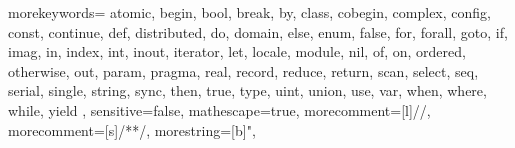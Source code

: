   {
    morekeywords={
      atomic,
      begin, bool, break, by,
      class, cobegin, complex, config, const, continue,
      def, distributed, do, domain,
      else, enum,
      false, for, forall,
      goto,
      if, imag, in, index, int, inout, iterator,
      let, locale,
      module,
      nil,
      of, on, ordered, otherwise, out,
      param, pragma,
      real, record, reduce, return,
      scan, select, seq, serial, single, string, sync,
      then, true, type,
      uint, union, use,
      var,
      when, where, while,
      yield
    },
    sensitive=false,
    mathescape=true,
    morecomment=[l]{//},
    morecomment=[s]{/*}{*/},
    morestring=[b]",
}


\newcommand{\chpl}[1]{\lstinline[language=chapel,basicstyle=\ttfamily,keywordstyle=]!#1!}
\newcommand{\varname}[1]{\emph{#1}}
\newcommand{\typename}[1]{\emph{#1}}
\newcommand{\fnname}[1]{\chpl{#1}}






\newenvironment{protobody}{\begin{quote}}{\end{quote}}
